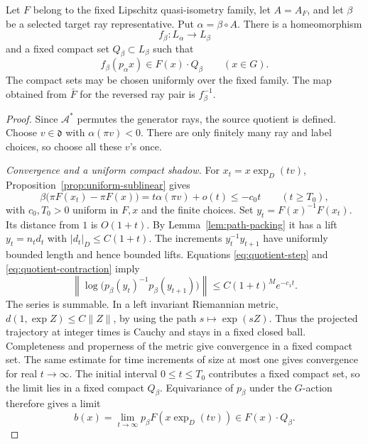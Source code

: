 \begin{lemma}
\label{lem:ray-boundaries}
Let $F$ belong to the fixed Lipschitz quasi-isometry family, let
$A=A_F$, and let $\beta$ be a selected target ray representative.  Put
$\alpha=\beta\circ A$.  There is a homeomorphism
\[
 f_\beta:L_\alpha\longrightarrow L_\beta
\]
and a fixed compact set $Q_\beta\subset L_\beta$ such that
\begin{equation}
\label{eq:boundary-shadow}
 f_\beta(p_\alpha x)\in F(x)\cdot Q_\beta
 \qquad(x\in G).
\end{equation}
The compact sets may be chosen uniformly over the fixed family.
The map obtained from $\bar F$ for the reversed ray pair is
$f_\beta^{-1}$.
\end{lemma}

\begin{proof}
Since $\mathcal A^*$ permutes the generator rays, the source quotient
is defined.  Choose $v\in\mathfrak d$ with $\alpha(\pi v)<0$.
There are only finitely many ray and label choices, so choose all
these $v$'s once.

\smallskip
\noindent\emph{Convergence and a uniform compact shadow.}
For $x_t=x\exp_D(tv)$, Proposition~\ref{prop:uniform-sublinear} gives
\[
 \beta\bigl(\pi F(x_t)-\pi F(x)\bigr)
 =t\alpha(\pi v)+o(t)\le-c_0t
 \qquad(t\ge T_0),
\]
with $c_0,T_0>0$ uniform in $F,x$ and the finite choices.
Set $y_t=F(x)^{-1}F(x_t)$.  Its distance from $1$ is $O(1+t)$.
By Lemma~\ref{lem:path-packing} it has a lift $y_t=n_td_t$ with
$|d_t|_D\le C(1+t)$.  The increments $y_t^{-1}y_{t+1}$ have
uniformly bounded length and hence bounded lifts.  Equations
\eqref{eq:quotient-step} and \eqref{eq:quotient-contraction} imply
\[
 \left\|\log\bigl(p_\beta(y_t)^{-1}p_\beta(y_{t+1})\bigr)\right\|
 \le C(1+t)^M e^{-c_1t}.
\]
The series is summable.  In a left invariant Riemannian metric,
$d(1,\exp Z)\le C\|Z\|$, by using the path $s\mapsto\exp(sZ)$.
Thus the projected trajectory at integer times is Cauchy and stays
in a fixed closed ball.  Completeness and properness of the metric
give convergence in a fixed compact set.
The same estimate for time increments of size at most one gives
convergence for real $t\to\infty$.  The initial interval
$0\le t\le T_0$ contributes a fixed compact set, so the limit lies
in a fixed compact $Q_\beta$.  Equivariance of $p_\beta$ under
the $G$-action therefore gives a limit
\begin{equation}
\label{eq:boundary-limit}
 b(x)=\lim_{t\to\infty}p_\beta F(x\exp_D(tv))
 \in F(x)\cdot Q_\beta .
\end{equation}


\end{proof}
